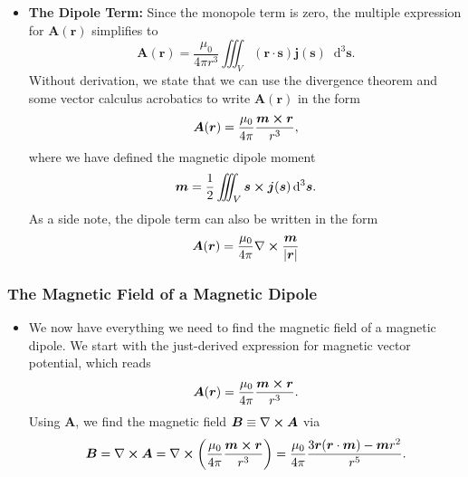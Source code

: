 \documentclass[11pt, a4paper]{article}
\newcommand{\diff}{\mathop{}\!\mathrm{d}} %
\renewcommand{\vec}[1]{\bm{#1}} %
\renewcommand{\r}{\vec{r}}
\newcommand{\B}{\vec{B}} %
\newcommand{\A}{\vec{A}} %
\newcommand{\mm}{\mu_{0}}  %
\newcommand{\m}{\vec{m}}  %
\renewcommand{\j}{\vec{j}}  %
\newcommand{\s}{\vec{s}}  %
\newcommand{\ds}{\diff^{3} \s}  %
\renewcommand{\curl}{\nabla \cross}
\begin{document}
\begin{itemize}
    \item \textbf{The Dipole Term:} Since the monopole term is zero, the multiple expression for $ \A(\r) $ simplifies to
	\begin{equation*}
		 \A(\r) = \frac{\mm}{4\pi r^{3}} \iiint_{V}(\r \cdot \s)\j(\s)\ds.
	\end{equation*}
    Without derivation, we state that we can use the divergence theorem and some vector calculus acrobatics to write $ \A(\r) $ in the form
	\begin{equation*}
		\A(\r) = \frac{\mm}{4\pi}\frac{\m \cross \r}{r^{3}},
	\end{equation*}
	where we have defined the magnetic dipole moment
	\begin{equation*}
		\m = \frac{1}{2}\iiint_{V} \s \cross \j(\s) \ds.
	\end{equation*}
	As a side note, the dipole term can also be written in the form
	\begin{equation*}
		\A(\r) =  \frac{\mm}{4\pi} \curl \frac{\m}{\abs{\r}}
	\end{equation*}
\end{itemize}

\subsubsection{The Magnetic Field of a Magnetic Dipole}
\begin{itemize}
	\item We now have everything we need to find the magnetic field of a magnetic dipole. We start with the just-derived expression for magnetic vector potential, which reads
	\begin{equation*}
		\A(\r) = \frac{\mm}{4\pi}\frac{\m \cross \r}{r^{3}}.
	\end{equation*}
	Using $ \A $, we find the magnetic field $ \B \equiv \curl \A $ via
	\begin{equation*}
		\B = \curl \A = \curl \left(\frac{\mm}{4\pi}\frac{\m \cross \r}{r^{3}}\right) = \frac{\mm}{4\pi} \frac{3\r(\r \cdot \m) - \m r^{2}}{r^{5}}.
	\end{equation*}
	
\end{itemize}
\end{document}
